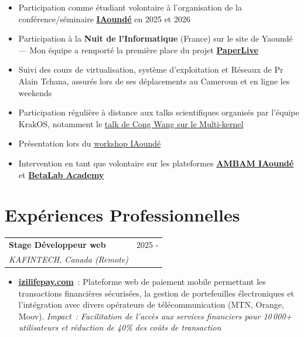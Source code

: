 \documentclass[12pt, a4paper]{article}
\begin{document}
\vspace{4pt}
\begin{itemize}[leftmargin=1.4em, itemsep=2pt, topsep=2pt, parsep=0pt]
  \item Participation comme \'etudiant volontaire \`a l'organisation de la conf\'erence/s\'eminaire \href{https://grenoble.iaounde.com/}{\textbf{IAound\'e}} en 2025 et 2026
  \item Participation \`a la \textbf{Nuit de l'Informatique} (France) sur le site de Yaound\'e --- Mon \'equipe a remport\'e la premi\`ere place du projet \href{https://www.nuitdelinfo.com/inscription/defis/511}{\textbf{PaperLive}}
  \item Suivi des cours de virtualisation, syst\`eme d'exploitation et R\'eseaux de Pr Alain Tchana, assur\'es lors de ses d\'eplacements au Cameroun et en ligne les weekends
  \item Participation r\'eguli\`ere \`a distance aux talks scientifiques organis\'es par l'\'equipe KrakOS, notamment le \href{https://www.liglab.fr/fr/presentation/animation-scientifique/organisation-devenements/talk-cong-wang}{talk de Cong Wang sur le Multi-kernel}
  \item Pr\'esentation lors du \href{https://helios.academy/ws1.html}{workshop IAound\'e}
  \item Intervention en tant que volontaire sur les plateformes \href{https://abam.iaounde.com/}{\textbf{AMBAM IAound\'e}} et \href{https://betalab.academy/}{\textbf{BetaLab Academy}}
\end{itemize}




\newpage

\section{Exp\'eriences Professionnelles}

\vspace{2pt}
\noindent\begin{tabularx}{\linewidth}{@{}X r@{}}
  {\bfseries\color{primary}Stage D\'eveloppeur web} &
  {\small\textcolor{textgray}{2025 -}} \\
  {\itshape\color{textgray}KAFINTECH, Canada (Remote)} & \\
\end{tabularx}
\begin{itemize}[leftmargin=1.4em, itemsep=1pt, topsep=2pt, parsep=0pt]
  \item \href{https://izilifepay.com/}{\textbf{izilifepay.com}}~: Plateforme web de paiement mobile permettant les transactions financi\`eres s\'ecuris\'ees, la gestion de portefeuilles \'electroniques et l'int\'egration avec divers op\'erateurs de t\'el\'ecommunication (MTN, Orange, Moov). \textit{Impact~: Facilitation de l'acc\`es aux services financiers pour 10\,000+ utilisateurs et r\'eduction de 40\% des co\^uts de transaction}
\end{itemize}
\end{document}
